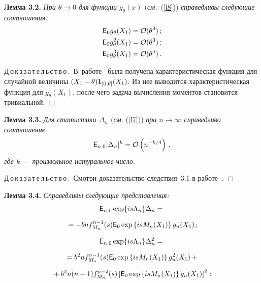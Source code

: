 \begin{multicols}{2}
\smallskip

\noindent
\textbf{Лемма 3.2.}
\textit{При $\theta \to 0$ для функции $g_{\theta}(x)$ $($см.}\ (\ref{l8})) \textit{справедливы следующие соотношения:}
\begin{align*}
{{\sf E}}_{0} g_{\theta}(X_1) &= {\cal O}(\theta^3)\,;\\
{{\sf E}}_{0} g_{\theta}^2(X_1) &= {\cal O}(\theta^3)\,;\\
{{\sf E}}_{0} g_{\theta}^3(X_1) &= {\cal O}(\theta^4)\,.
\end{align*}


\noindent
Д\,о\,к\,а\,з\,а\,т\,е\,л\,ь\,с\,т\,в\,о\,.\
В~работе~\cite{article} была получена характеристическая функция для случайной величины 
$(X_1-\theta){{\bf 1}}_{[0,\theta]}(X_1)$. Из нее выводится характеристическая функция для $g_{\theta}(X_1)$, 
после чего задача вычисления моментов становится тривиальной. \hfill $\Box$


\smallskip

\noindent
\textbf{Лемма 3.3.}
\textit{Для статистики $\Delta_n$ $($см.} (\ref{l7})) \textit{при $n \to \infty$ справедливо соотношение}
$$
{{\sf E}}_{n,0} |\Delta_n|^k = {\cal O}\left(n^{-k/4}\right)\,,
$$
\textit{где $k$ --- произвольное натуральное число.}


\smallskip

\noindent
Д\,о\,к\,а\,з\,а\,т\,е\,л\,ь\,с\,т\,в\,о\,.\ Смотри доказательство следствия~3.1 в работе~\cite{article}.
\hfill $\Box$


\smallskip

\noindent
\textbf{Лемма 3.4.}
\textit{Справедливы следующие представления:}
\begin{multline*}
{{\sf E}}_{n,0}\exp\{is\Lambda_n\}\Delta_n ={}\\[6pt]
{}= -b n f^{n-1}_{M_n}(s) {{\sf E}}_0 \exp\left\{isM_n(X_1)\right\} g_n(X_1)\,;
\end{multline*}
\vspace*{-18pt}

\noindent
\begin{multline*}
{{\sf E}}_{n,0}\exp\{is\Lambda_n\}\Delta_n^2 ={}\\[6pt]
{}= b^2 n  f_{M_n}^{n-1}(s)  {{\sf E}}_0 \exp\left\{is M_n(X_1)\right\} g_n^2(X_1) +{}\\[6pt]
{}
+ b^2n(n-1) f_{M_n}^{n-2}(s)  \left[{{\sf E}}_0 \exp\left\{is M_n(X_1)\right\} g_n(X_1)\right]^2\,;
\end{multline*}
\vspace*{-18pt}


\end{multicols}
